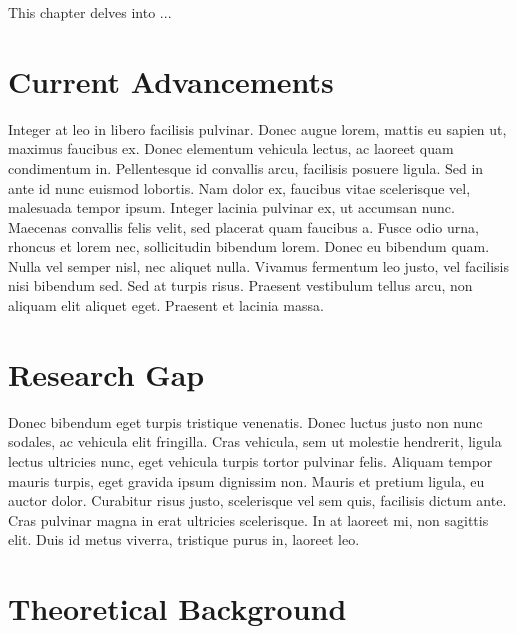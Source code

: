 This chapter delves into ...

\section{Current Advancements}
Integer at leo in libero facilisis pulvinar. Donec augue lorem, mattis eu sapien ut, maximus faucibus ex. Donec elementum vehicula lectus, ac laoreet quam condimentum in. Pellentesque id convallis arcu, facilisis posuere ligula. Sed in ante id nunc euismod lobortis. Nam dolor ex, faucibus vitae scelerisque vel, malesuada tempor ipsum. Integer lacinia pulvinar ex, ut accumsan nunc. Maecenas convallis felis velit, sed placerat quam faucibus a. Fusce odio urna, rhoncus et lorem nec, sollicitudin bibendum lorem. Donec eu bibendum quam. Nulla vel semper nisl, nec aliquet nulla. Vivamus fermentum leo justo, vel facilisis nisi bibendum sed. Sed at turpis risus. Praesent vestibulum tellus arcu, non aliquam elit aliquet eget. Praesent et lacinia massa.

\section{Research Gap}
Donec bibendum eget turpis tristique venenatis. Donec luctus justo non nunc sodales, ac vehicula elit fringilla. Cras vehicula, sem ut molestie hendrerit, ligula lectus ultricies nunc, eget vehicula turpis tortor pulvinar felis. Aliquam tempor mauris turpis, eget gravida ipsum dignissim non. Mauris et pretium ligula, eu auctor dolor. Curabitur risus justo, scelerisque vel sem quis, facilisis dictum ante. Cras pulvinar magna in erat ultricies scelerisque. In at laoreet mi, non sagittis elit. Duis id metus viverra, tristique purus in, laoreet leo.

\section{Theoretical Background}
